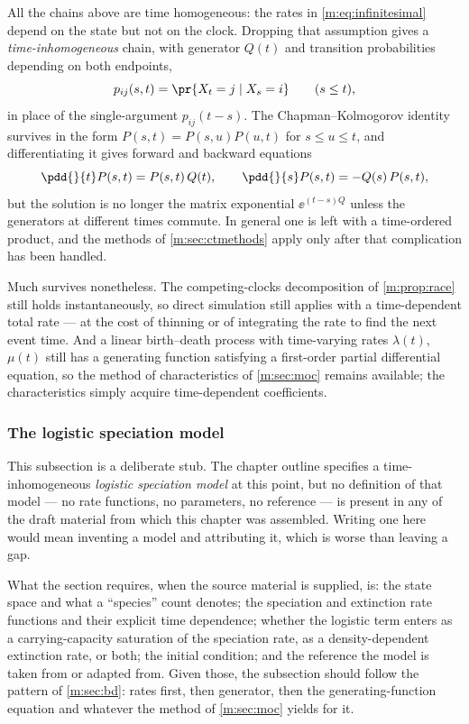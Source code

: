 All the chains above are time homogeneous: the rates in \cref{m:eq:infinitesimal}
depend on the state but not on the clock. Dropping that assumption gives a
\emph{time-inhomogeneous} chain, with generator $Q(t)$ and transition
probabilities depending on both endpoints,
\begin{equation}
\label{m:eq:inhomogtrans}
p_{ij}(s,t) = \pr{X_t=j\mid X_s=i}
\qquad(s\le t),
\end{equation}
in place of the single-argument $p_{ij}(t-s)$. The Chapman--Kolmogorov identity
survives in the form $P(s,t) = P(s,u)P(u,t)$ for $s\le u\le t$, and differentiating
it gives forward and backward equations
\begin{equation}
\label{m:eq:inhomogkolmogorov}
\pdd{}{t}P(s,t) = P(s,t)\,Q(t),
\qquad
\pdd{}{s}P(s,t) = -Q(s)\,P(s,t),
\end{equation}
but the solution is no longer the matrix exponential $\ee^{(t-s)Q}$ unless the
generators at different times commute. In general one is left with a
time-ordered product, and the methods of \cref{m:sec:ctmethods} apply only after
that complication has been handled.

Much survives nonetheless. The competing-clocks decomposition of
\cref{m:prop:race} still holds instantaneously, so direct simulation still applies
with a time-dependent total rate --- at the cost of thinning or of integrating the
rate to find the next event time. And a linear birth--death process with
time-varying rates $\lambda(t)$, $\mu(t)$ still has a generating function
satisfying a first-order partial differential equation, so the method of
characteristics of \cref{m:sec:moc} remains available; the characteristics simply
acquire time-dependent coefficients.

\subsubsection{The logistic speciation model}
\label{m:sec:logisticspeciation}

\begin{remark}
\label{m:rem:speciationstub}
This subsection is a deliberate stub. The chapter outline specifies a
time-inhomogeneous \emph{logistic speciation model} at this point, but no
definition of that model --- no rate functions, no parameters, no reference --- is
present in any of the draft material from which this chapter was assembled. Writing
one here would mean inventing a model and attributing it, which is worse than
leaving a gap.

What the section requires, when the source material is supplied, is: the state
space and what a ``species'' count denotes; the speciation and extinction rate
functions and their explicit time dependence; whether the logistic term enters as a
carrying-capacity saturation of the speciation rate, as a density-dependent
extinction rate, or both; the initial condition; and the reference the model is
taken from or adapted from. Given those, the subsection should follow the pattern
of \cref{m:sec:bd}: rates first, then generator, then the generating-function
equation and whatever the method of \cref{m:sec:moc} yields for it.
\end{remark}

